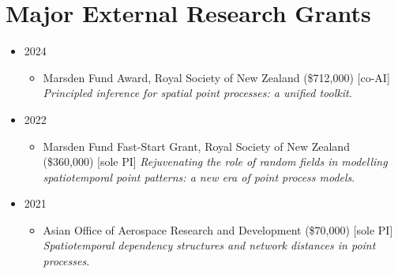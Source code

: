 \documentclass[10pt,a4paper]{moderncv}
\begin{document}
\section{Major External Research Grants}

\vspace{6pt}
\begin{itemize}
  \item 2024
  \begin{itemize}
  \item Marsden Fund Award, Royal Society of New Zealand (\$712,000) [co-AI] \textit{Principled inference for spatial point processes: a unified toolkit}. 
  \end{itemize}
\item 2022
  \begin{itemize}
  \item Marsden Fund Fast-Start Grant, Royal Society of New Zealand (\$360,000) [sole PI] \textit{Rejuvenating the role of random fields in modelling spatiotemporal point patterns: a new era of point process models}.
  \end{itemize}
\item 2021
  \begin{itemize}
  \item Asian Office of Aerospace Research and Development (\$70,000) [sole PI] \textit{Spatiotemporal dependency structures and network distances in point processes}.
  \end{itemize}
\end{itemize}
\end{document}
